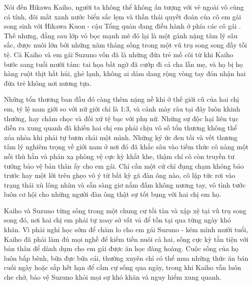 \documentclass[../main.tex]{subfiles}
\begin{document}
\color{black}


Nói đến Hikawa Kaiho, người ta không thể không ấn tượng với vẻ ngoài vô cùng cá tính, đôi mắt xanh nước biển sắc lẹm và thần thái quyết đoán của cô em gái song sinh với Hikawa Kuon - cậu Tổng quản đang điều hành ở phía các cô gái \hll. Thế nhưng, đằng sau lớp vỏ bọc mạnh mẽ đó lại là một gánh nặng tâm lý sâu sắc, được nuôi lớn bởi những năm tháng sống trong một vũ trụ song song đầy tồi tệ. Cả Kaiho và em gái Suzuno vốn đã là những đứa trẻ mồ côi từ khi Kaiho bước sang tuổi mười tám: tai họa bất ngờ đã cướp đi cả cha lẫn mẹ, và họ bị họ hàng ruột thịt hắt hủi, ghẻ lạnh, không ai dám dang rộng vòng tay đón nhận hai đứa trẻ không nơi nương tựa.

Những tổn thương ban đầu đó càng thêm nặng nề khi ở thế giới cũ của hai chị em, tỷ lệ nam giới so với nữ giới chỉ là 1:3, và cánh mày râu tại đây luôn khinh thường, hay châm chọc và đối xử tệ bạc với phụ nữ. Những sự độc hại liên tục diễn ra xung quanh đã khiến hai chị em phải chịu vô số tổn thương không thể xóa nhòa khi phải tự bươn chải một mình. Những ký ức đen tối và vết thương tâm lý nghiêm trọng về giới nam ở nơi đó đã khắc sâu vào tiềm thức cô nàng một nỗi thù hằn và phản xạ phòng vệ cực kỳ khắt khe, thậm chí cô còn truyền tư tưởng bảo vệ bản thân ấy cho em gái. Chỉ cần một cử chỉ đụng chạm không báo trước hay một lời trêu ghẹo vô ý từ bất kỳ gã đàn ông nào, cô lập tức rơi vào trạng thái xù lông nhím và sẵn sàng giơ nắm đấm không nương tay, vô tình tước luôn cơ hội cho những người đàn ông thật sự tốt bụng với hai chị em họ.

Kaiho và Suzuno từng sống trong một chung cư tồi tàn và xập xệ tại vũ trụ song song đó, nơi hai chị em phải tự xoay sở vất vả để tồn tại qua từng ngày khó khăn. Vì phải nghỉ học sớm để chăm lo cho em gái Suzuno - kém mình mười tuổi, Kaiho đã phải làm đủ mọi nghề để kiếm tiền nuôi cả hai, sống cực kỳ tằn tiện với bản thân để dành dụm cho em gái được ăn học đàng hoàng. Cuộc sống của họ luôn bấp bênh, bữa đực bữa cái, thường xuyên chỉ có thể mua những thức ăn bán cuối ngày hoặc sắp hết hạn để cầm cự sống qua ngày, trong khi Kaiho vẫn luôn che chở, bảo vệ Suzuno khỏi mọi sự khó khăn và nguy hiểm xung quanh.
\end{document}
